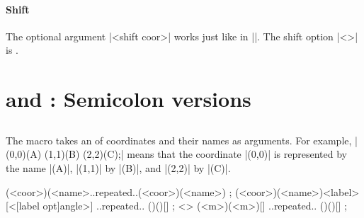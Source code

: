 \begin{tzcode}{.3}
\end{tzcode}

\paragraph{Shift} The optional argument |<shift coor>| works just like in |\tzcoor|.
The  shift option |<>| is .

\begin{tzcode}{.3}
\end{tzcode}

\section{\protect\cmd{\tzcoors} and \protect\cmd{\tzcoors*}: Semicolon versions}
\label{s:tzcoors}

\subsection{\protect\cmd{\tzcoors}}
\label{ss:tzcoors}

The macro \icmd{\tzcoors} takes an  of coordinates and their names as arguments.
For example, |\tzcoors(0,0)(A) (1,1)(B) (2,2)(C);| means that the coordinate |(0,0)| is represented by the name |(A)|, |(1,1)| by |(B)|, and |(2,2)| by |(C)|.

\begin{tzdef}
\tzcoors(<coor>)(<name>..repeated..(<coor>)(<name>) ;
(<coor>)(<name>){<label>}[<[label opt]angle>] 
                     ..repeated.. ()(){}[] ;
  <> (<m>)(<m>){}[] ..repeated.. ()(){}[] ;
\end{tzdef}

